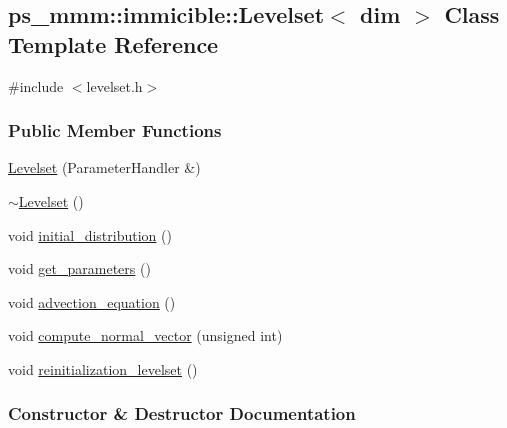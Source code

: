 \hypertarget{classps__mmm_1_1immicible_1_1_levelset}{}\subsection{ps\+\_\+mmm\+:\+:immicible\+:\+:Levelset$<$ dim $>$ Class Template Reference}
\label{classps__mmm_1_1immicible_1_1_levelset}


{\ttfamily \#include $<$levelset.\+h$>$}

\subsubsection*{Public Member Functions}
\begin{DoxyCompactItemize}
\item 
\hyperlink{classps__mmm_1_1immicible_1_1_levelset_ab0f403cfb3488e101c9d0eacd38f7180}{Levelset} (Parameter\+Handler \&)
\item 
\hyperlink{classps__mmm_1_1immicible_1_1_levelset_ad7e99e67b0400981ffdecc35e76bbcda}{$\sim$\+Levelset} ()
\item 
void \hyperlink{classps__mmm_1_1immicible_1_1_levelset_a19fafeec3da1eac25fc45994f42cc5da}{initial\+\_\+distribution} ()
\item 
void \hyperlink{classps__mmm_1_1immicible_1_1_levelset_a25af16f71dcb1ab8565e5be3f2cc17fb}{get\+\_\+parameters} ()
\item 
void \hyperlink{classps__mmm_1_1immicible_1_1_levelset_a986cfe4cbffca1df245ecda8dfc28e09}{advection\+\_\+equation} ()
\item 
void \hyperlink{classps__mmm_1_1immicible_1_1_levelset_abbefa7c5ecf5176832c9d5daa4e2223f}{compute\+\_\+normal\+\_\+vector} (unsigned int)
\item 
void \hyperlink{classps__mmm_1_1immicible_1_1_levelset_a9f748dfc32696249e78add3d583414e9}{reinitialization\+\_\+levelset} ()
\end{DoxyCompactItemize}


\subsubsection{Constructor \& Destructor Documentation}
\hypertarget{classps__mmm_1_1immicible_1_1_levelset_ab0f403cfb3488e101c9d0eacd38f7180}{}
